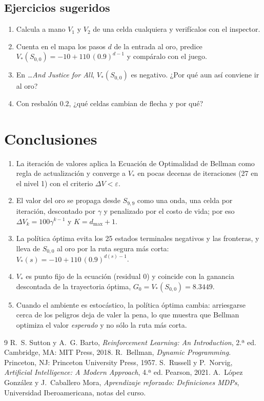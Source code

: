 \documentclass[11pt,letterpaper]{article}
\begin{document}
\subsection{Ejercicios sugeridos}
\begin{enumerate}[leftmargin=*]
  \item Calcula a mano $V_1$ y $V_2$ de una celda cualquiera y verifícalos con el inspector.
  \item Cuenta en el mapa los pasos $d$ de la entrada al oro, predice $V_*(S_{0,0}) = -10 + 110\,(0.9)^{d-1}$ y compáralo con el juego.
  \item En \emph{\ldots And Justice for All}, $V_*(S_{0,0})$ es negativo. ¿Por qué aun así conviene ir al oro?
  \item Con resbalón $0.2$, ¿qué celdas cambian de flecha y por qué?
\end{enumerate}

\section{Conclusiones}
\begin{enumerate}[leftmargin=*]
  \item La iteración de valores aplica la Ecuación de Optimalidad de Bellman como regla de actualización y converge a $V_*$ en pocas decenas de iteraciones (27 en el nivel 1) con el criterio $\Delta V < \varepsilon$.
  \item El valor del oro se propaga desde $S_{9,9}$ como una onda, una celda por iteración, descontado por $\gamma$ y penalizado por el costo de vida; por eso $\Delta V_k = 100\gamma^{k-1}$ y $K = d_{\max} + 1$.
  \item La política óptima evita los 25 estados terminales negativos y las fronteras, y lleva de $S_{0,0}$ al oro por la ruta segura más corta: $V_*(s) = -10 + 110\,(0.9)^{d(s)-1}$.
  \item $V_*$ es punto fijo de la ecuación (residual 0) y coincide con la ganancia descontada de la trayectoria óptima, $G_0 = V_*(S_{0,0}) = 8.3449$.
  \item Cuando el ambiente es estocástico, la política óptima cambia: arriesgarse cerca de los peligros deja de valer la pena, lo que muestra que Bellman optimiza el valor \emph{esperado} y no sólo la ruta más corta.
\end{enumerate}

\begin{thebibliography}{9}
 R.~S. Sutton y A.~G. Barto, \emph{Reinforcement Learning: An Introduction}, 2.ª ed. Cambridge, MA: MIT Press, 2018.
 R.~Bellman, \emph{Dynamic Programming}. Princeton, NJ: Princeton University Press, 1957.
 S.~Russell y P.~Norvig, \emph{Artificial Intelligence: A Modern Approach}, 4.ª ed. Pearson, 2021.
 A.~López González y J.~Caballero Mora, \emph{Aprendizaje reforzado: Definiciones MDPs}, Universidad Iberoamericana, notas del curso.
\end{thebibliography}
\end{document}
